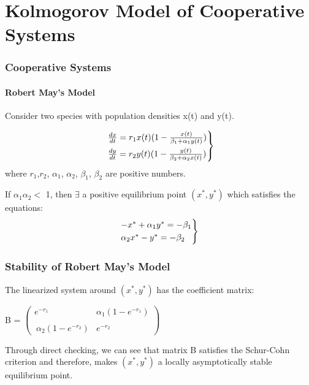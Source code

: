 \documentclass[xcolor={svgnames},hyperref={colorlinks,allcolors=Blue}]{beamer}
\begin{document}

\section{Kolmogorov Model of Cooperative Systems}

\begin{frame}
\frametitle{Cooperative Systems}
\framesubtitle{Robert May's Model}

Consider two species with population densities x(t) and y(t). \pause

	\begin{equation}
		\begin{rcases}
		~\frac{dx}{dt} = r_1x(t)(1-\frac{x(t)}{\beta_1+ \alpha_1y(t)} )\\
		~\frac{dy}{dt} = r_2y(t)(1-\frac{y(t)}{\beta_2+\alpha_2x(t)})
		\end{rcases}
	\end{equation}
	where $r_1$,$r_2$, $\alpha_1$, $\alpha_2$, $\beta_1$, $\beta_2$ are positive numbers. 

\pause
If $\alpha_1\alpha_2 <$ 1, then $\exists$ a positive equilibrium point $(x^*,y^*)$ which satisfies the equations: 
	\begin{equation}
		\begin{rcases}
		-x^* + \alpha_1y^* = -\beta_1 \\
		\alpha_2x^* - y^* = -\beta_2
		\end{rcases}
	\end{equation}

\end{frame}

\begin{frame}
\frametitle{Stability of Robert May's Model}
The linearized system around $(x^*,y^*)$ has the coefficient matrix: 

\begin{center}
B = $\begin{pmatrix}
    e^{-r_1} & \alpha_1(1-e^{-r_1}) \\~\\
    ~\alpha_2(1-e^{-r_2}) & e^{-r_2}
    \end{pmatrix}$
\end{center}

\pause
Through direct checking, we can see that matrix B satisfies the Schur-Cohn criterion and therefore, makes $(x^*,y^*)$  a locally asymptotically stable equilibrium point.

\end{frame}
\end{document}
